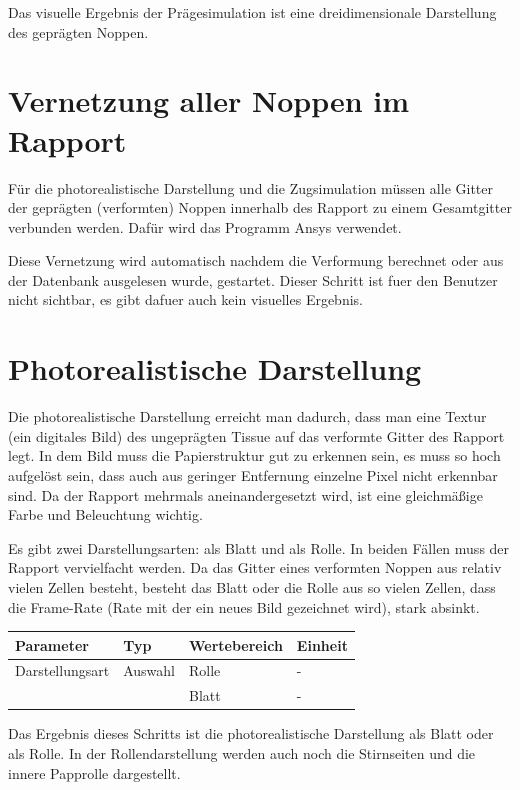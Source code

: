 Das visuelle Ergebnis der Pr\"agesimulation ist eine dreidimensionale
Darstellung des gepr\"agten Noppen.

\section{Vernetzung aller Noppen im Rapport}
F\"ur die photorealistische Darstellung und die Zugsimulation m\"ussen
alle Gitter der gepr\"agten (verformten) Noppen innerhalb des Rapport zu einem 
Gesamtgitter verbunden werden. Daf\"ur wird das Programm Ansys verwendet.

Diese Vernetzung wird automatisch nachdem die Verformung berechnet oder aus
der Datenbank ausgelesen wurde, gestartet. Dieser Schritt ist fuer den
Benutzer nicht sichtbar, es gibt dafuer auch kein visuelles Ergebnis.

\section{Photorealistische Darstellung}
Die photorealistische Darstellung erreicht man dadurch, dass man eine
Textur (ein digitales Bild) des ungepr\"agten Tissue auf das verformte
Gitter des Rapport legt. In dem Bild muss die Papierstruktur gut zu
erkennen sein, es muss so hoch aufgel\"ost sein, dass auch aus geringer 
Entfernung einzelne Pixel nicht erkennbar sind. Da der Rapport mehrmals
aneinandergesetzt wird, ist eine gleichm\"a\ss ige Farbe und Beleuchtung
wichtig. 

Es gibt zwei Darstellungsarten: als Blatt und als Rolle. In beiden F\"allen
muss der Rapport vervielfacht werden. Da das Gitter eines verformten
Noppen aus relativ vielen Zellen besteht, besteht das Blatt oder die
Rolle aus so vielen Zellen, dass die Frame-Rate (Rate mit der ein
neues Bild gezeichnet wird), stark absinkt.

\vspace{0.5cm}
\begin{tabular}{|l|l|l|l|} \hline
Parameter 	& Typ 		& Wertebereich 	& Einheit	\\ \hline
Darstellungsart	& Auswahl	& Rolle 	& -		\\ 
		&	 	& Blatt		& -		\\ \hline
\end{tabular}
\vspace{0.5cm}

Das Ergebnis dieses Schritts ist die photorealistische Darstellung als
Blatt oder als Rolle. In der Rollendarstellung werden auch noch
die Stirnseiten und die innere Papprolle dargestellt.

